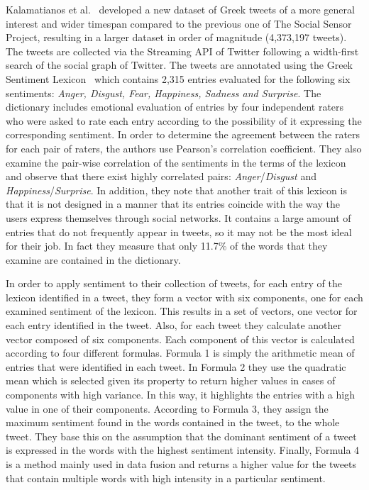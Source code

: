 Kalamatianos et al.~\cite{KMSA15} developed a new dataset of Greek tweets
of a more general interest and wider timespan
compared to the previous one of The Social Sensor Project,
resulting in a larger dataset in order of magnitude (4,373,197 tweets).
The tweets are collected via the Streaming API of Twitter
following a width-first search of the social graph of Twitter.
The tweets are annotated using the Greek Sentiment Lexicon~\cite{TPK14}
which contains 2,315 entries evaluated for the following six sentiments:
\emph{Anger, Disgust, Fear, Happiness, Sadness and Surprise}.
The dictionary includes emotional evaluation of entries by four independent raters
who were asked to rate each entry according
to the possibility of it expressing the corresponding sentiment.
In order to determine the agreement between the raters for each pair of raters,
the authors use Pearson's correlation coefficient.
They also examine the pair-wise correlation of the sentiments in the terms of the lexicon
and observe that there exist highly correlated pairs:
\emph{Anger}/\emph{Disgust}
and \emph{Happiness}/\emph{Surprise}.
In addition, they note that another trait of this lexicon is
that it is not designed in a manner that its entries coincide
with the way the users express themselves through social networks.
It contains a large amount of entries that do not frequently appear in tweets,
so it may not be the most ideal for their job.
In fact they measure that only 11.7\% of the words
that they examine are contained in the dictionary.

In order to apply sentiment to their collection of tweets,
for each entry of the lexicon identified in a tweet,
they form a vector with six components, one for each examined sentiment of the lexicon.
This results in a set of vectors, one vector for each entry identified in the tweet.
Also, for each tweet they calculate another vector composed of six components.
Each component of this vector is calculated according to four different formulas.
Formula 1 is simply the arithmetic mean of entries that were identified in each tweet.
In Formula 2 they use the quadratic mean which is selected given its property
to return higher values in cases of components with high variance.
In this way, it highlights the entries with a high value in one of their components.
According to Formula 3, they assign the maximum sentiment
found in the words contained in the tweet, to the whole tweet.
They base this on the assumption that the dominant sentiment of a tweet
is expressed in the words with the highest sentiment intensity.
Finally, Formula 4 is a method mainly used in data fusion
and returns a higher value for the tweets that contain multiple words
with high intensity in a particular sentiment.

